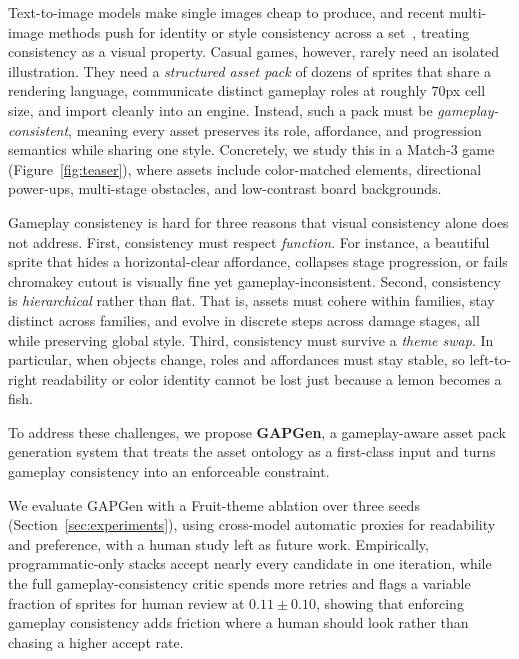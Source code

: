 \documentclass{article}
\begin{document}
Text-to-image models make single images cheap to produce, and recent multi-image methods push
for identity or style consistency across a set~\cite{jia2025t2is,consistyle2025}, treating
consistency as a visual property.
Casual games, however, rarely need an isolated illustration.
They need a \emph{structured asset pack} of dozens of sprites that share a rendering language,
communicate distinct gameplay roles at roughly \(70\)px cell size, and import cleanly into an
engine.
Instead, such a pack must be \emph{gameplay-consistent}, meaning every asset preserves its role,
affordance, and progression semantics while sharing one style.
Concretely, we study this in a Match-3 game (Figure~\ref{fig:teaser}), where assets include
color-matched elements, directional power-ups, multi-stage obstacles, and low-contrast board
backgrounds.

Gameplay consistency is hard for three reasons that visual consistency alone does not address.
First, consistency must respect \emph{function}.
For instance, a beautiful sprite that hides a horizontal-clear affordance, collapses stage
progression, or fails chromakey cutout is visually fine yet gameplay-inconsistent.
Second, consistency is \emph{hierarchical} rather than flat.
That is, assets must cohere within families, stay distinct across families, and evolve in discrete
steps across damage stages, all while preserving global style.
Third, consistency must survive a \emph{theme swap}.
In particular, when objects change, roles and affordances must stay stable, so left-to-right
readability or color identity cannot be lost just because a lemon becomes a fish.

To address these challenges, we propose \textbf{GAPGen}, a gameplay-aware asset pack generation
system that treats the asset ontology as a first-class input and turns gameplay consistency into
an enforceable constraint.

We evaluate GAPGen with a Fruit-theme ablation over three seeds
(Section~\ref{sec:experiments}), using cross-model automatic proxies for readability and
preference, with a human study left as future work.
Empirically, programmatic-only stacks accept nearly every candidate in one iteration, while the
full gameplay-consistency critic spends more retries and flags a variable fraction of sprites for
human review at \(0.11 \pm 0.10\), showing that enforcing gameplay consistency adds friction where
a human should look rather than chasing a higher accept rate.
\end{document}
